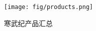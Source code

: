 \begin{figure}[!htb]
  \centering
  \texttt{[image: fig/products.png]}
  \caption{寒武纪产品汇总}
  \label{products}
\end{figure}
